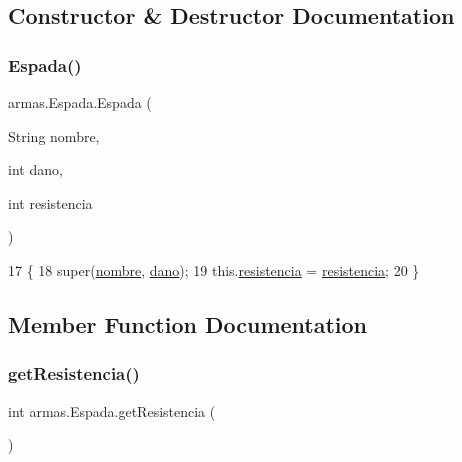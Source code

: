 \subsection{Constructor \& Destructor Documentation}
\mbox{\label{classarmas_1_1_espada_a0f4b04c25f57f64a45de3c2ba3398fc2}} 
\subsubsection{\texorpdfstring{Espada()}{Espada()}}
{\footnotesize\ttfamily armas.\+Espada.\+Espada (\begin{DoxyParamCaption}\item[{String}]{nombre,  }\item[{int}]{dano,  }\item[{int}]{resistencia }\end{DoxyParamCaption})\hspace{0.3cm}{\ttfamily [inline]}}


\begin{DoxyCode}
17     \{
18         super(\mbox{\hyperlink{classarmas_1_1_arma_abdd717c561a99a3436dbfda8129b5581}{nombre}}, \mbox{\hyperlink{classarmas_1_1_arma_a59396ee4b222360f19c8be08eb7d137b}{dano}});
19         this.\mbox{\hyperlink{classarmas_1_1_espada_a0d0a80a30cfd584c2b50023017919039}{resistencia}} = \mbox{\hyperlink{classarmas_1_1_espada_a0d0a80a30cfd584c2b50023017919039}{resistencia}};
20     \}
\end{DoxyCode}


\subsection{Member Function Documentation}
\mbox{\label{classarmas_1_1_espada_a4a87b5949bb0e68aad87dbf2deb04e75}} 
\subsubsection{\texorpdfstring{get\+Resistencia()}{getResistencia()}}
{\footnotesize\ttfamily int armas.\+Espada.\+get\+Resistencia (\begin{DoxyParamCaption}{ }\end{DoxyParamCaption})\hspace{0.3cm}{\ttfamily [inline]}}


